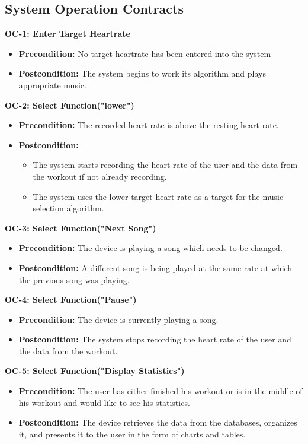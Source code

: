 \documentclass[letterpaper,english, 12pt]{scrreprt}
\begin{document}
\subsection{System Operation Contracts}
{\bf OC-1: Enter Target Heartrate}
\begin{itemize}
	\item {\bf Precondition: } No target heartrate has been entered into the system
	\item {\bf Postcondition: } The system begins to work its algorithm and plays appropriate music.
\end{itemize}

{\bf OC-2: Select Function("lower")}
\begin{itemize}
	\item {\bf Precondition: } The recorded heart rate is above the resting heart rate.
	\item {\bf Postcondition: } 
		\begin{itemize}
			\item The system starts recording the heart rate of the user and the data from the workout if not already recording.
			\item The system uses the lower target heart rate as a target for the music selection algorithm.
		\end{itemize}

\end{itemize}

{\bf OC-3: Select Function("Next Song")}
\begin{itemize}
	\item {\bf Precondition: } The device is playing a song which needs to be changed.
	\item {\bf Postcondition: } A different song is being played at the same rate at which the previous song was playing.

\end{itemize}

{\bf OC-4: Select Function("Pause")}
\begin{itemize}
	\item {\bf Precondition: } The device is currently playing a song.
	\item {\bf Postcondition: } The system stops recording the heart rate of the user and the data from the workout.

\end{itemize}

{\bf OC-5: Select Function("Display Statistics")}
\begin{itemize}
	\item {\bf Precondition: } The user has either finished his workout or is in the middle of his workout and would like to see his statistics.
	\item {\bf Postcondition: } The device retrieves the data from the databases, organizes it, and presents it to the user in the form of charts and tables.
\end{itemize}
\end{document}
